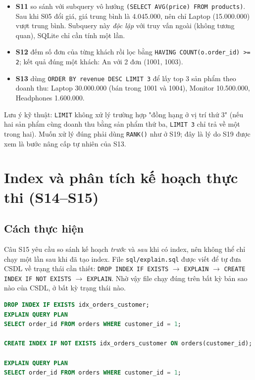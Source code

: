 \documentclass[12pt,a4paper]{article}
\newcommand{\code}[1]{\texttt{\small #1}}
\begin{document}
\begin{itemize}[leftmargin=1.2cm,itemsep=2pt]
  \item \textbf{S11} so sánh với subquery vô hướng \code{(SELECT AVG(price) FROM products)}.
        Sau khi S05 đổi giá, giá trung bình là 4.045.000, nên chỉ Laptop (15.000.000) vượt trung
        bình. Subquery này \emph{độc lập} với truy vấn ngoài (không tương quan), SQLite chỉ cần
        tính một lần.
  \item \textbf{S12} đếm số đơn của từng khách rồi lọc bằng \code{HAVING COUNT(o.order\_id) >= 2};
        kết quả đúng một khách: An với 2 đơn (1001, 1003).
  \item \textbf{S13} dùng \code{ORDER BY revenue DESC LIMIT 3} để lấy top 3 sản phẩm theo doanh
        thu: Laptop 30.000.000 (bán trong 1001 và 1004), Monitor 10.500.000, Headphones
        1.600.000.
\end{itemize}

Lưu ý kỹ thuật: \code{LIMIT} không xử lý trường hợp "đồng hạng ở vị trí thứ 3" (nếu hai sản phẩm
cùng doanh thu bằng sản phẩm thứ ba, \code{LIMIT 3} chỉ trả về một trong hai). Muốn xử lý đúng
phải dùng \code{RANK()} như ở S19; đây là lý do S19 được xem là bước nâng cấp tự nhiên của S13.

\section{Index và phân tích kế hoạch thực thi (S14--S15)}

\subsection{Cách thực hiện}

Câu S15 yêu cầu so sánh kế hoạch \emph{trước} và \emph{sau} khi có index, nên không thể chỉ chạy
một lần sau khi đã tạo index. File \code{sql/explain.sql} được viết để tự đưa CSDL về trạng thái
cần thiết: \code{DROP INDEX IF EXISTS} $\rightarrow$ \code{EXPLAIN} $\rightarrow$
\code{CREATE INDEX IF NOT EXISTS} $\rightarrow$ \code{EXPLAIN}. Nhờ vậy file chạy đúng trên bất kỳ
bản sao nào của CSDL, ở bất kỳ trạng thái nào.

\begin{lstlisting}[language=SQL,caption={Cặp EXPLAIN trước/sau index trong \code{sql/explain.sql}}]
DROP INDEX IF EXISTS idx_orders_customer;
EXPLAIN QUERY PLAN
SELECT order_id FROM orders WHERE customer_id = 1;

CREATE INDEX IF NOT EXISTS idx_orders_customer ON orders(customer_id);

EXPLAIN QUERY PLAN
SELECT order_id FROM orders WHERE customer_id = 1;
\end{lstlisting}
\end{document}
